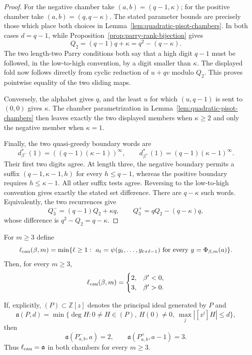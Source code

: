 \begin{proof}
For the negative chamber take $(a,b)=(q-1,\kappa)$; for the positive chamber
take $(a,b)=(q,q-\kappa)$.  The stated parameter bounds are precisely those
which place both choices in Lemma~\ref{lem:quadratic-pisot-chambers}.  In both
cases $d=q-1$, while Proposition~\ref{prop:parry-rank-bijection} gives
\[
Q_2=(q-1)q+\kappa=q^2-(q-\kappa).
\]
The two length-two Parry conditions both say that a high digit $q-1$ must be
followed, in the low-to-high convention, by a digit smaller than $\kappa$.
The displayed fold now follows directly from cyclic reduction of
$u+qv$ modulo $Q_2$.  This proves pointwise equality of the two sliding maps.

Conversely, the alphabet gives $q$, and the least $u$ for which
$(u,q-1)$ is sent to $(0,0)$ gives $\kappa$.  The chamber parametrization in
Lemma~\ref{lem:quadratic-pisot-chambers} then leaves exactly the two displayed
members when $\kappa\ge2$ and only the negative member when $\kappa=1$.

Finally, the two quasi-greedy boundary words are
\[
d_{\beta^-}^*(1)=((q-1)(\kappa-1))^\infty,
\qquad
d_{\beta^+}^*(1)=(q-1)(\kappa-1)^\infty.
\]
Their first two digits agree.  At length three, the negative boundary permits
a suffix $(q-1,\kappa-1,h)$ for every $h\le q-1$, whereas the positive
boundary requires $h\le\kappa-1$.  All other suffix tests agree.  Reversing
to the low-to-high convention gives exactly the stated set difference.
There are $q-\kappa$ such words.  Equivalently, the two recurrences give
\[
Q_3^-=(q-1)Q_2+\kappa q,\qquad
Q_3^+=qQ_2-(q-\kappa)q,
\]
whose difference is $q^2-Q_2=q-\kappa$.
\end{proof}

\begin{theorem}
\label{thm:quadratic-optimal-causal-inverse}
For $m\ge3$ define
\[
\ell_{\rm cau}(\beta,m)
=\min\{\ell\ge1:\ a_t=\psi(y_t,\ldots,y_{t+\ell-1})
\text{ for every }y=\Phi_{\beta,m}(a)\}.
\]
Then, for every $m\ge3$,
\[
\ell_{\rm cau}(\beta,m)=
\begin{cases}
2,&\beta'<0,\\
3,&\beta'>0.
\end{cases}
\]

If, explicitly, $(P)\subset\mathbb Z[z]$ denotes the principal ideal
generated by $P$ and
\[
\mathfrak a(P,d)=\min\{\deg H:0\ne H\in(P),\ H(0)\ne0,
\ \max_j|[z^j]H|\le d\},
\]
then
\[
\mathfrak a(P^-_{a,b},a)=2,
\qquad
\mathfrak a(P^+_{a,b},a-1)=3.
\]
Thus $\ell_{\rm cau}=\mathfrak a$ in both chambers for every $m\ge3$.
\end{theorem}

